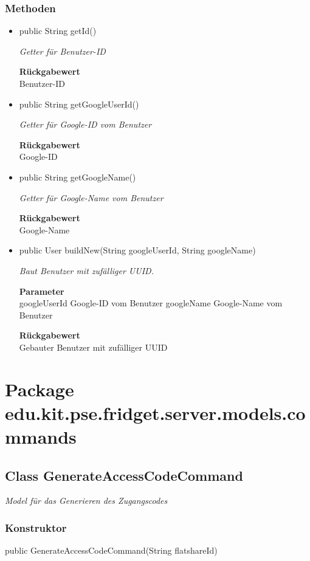 \documentclass[a4paper]{scrreprt}
\begin{document}
        \subsubsection{Methoden}
        \begin{itemize}
        	\item{public String getId()}
        	
        	\textit{Getter für Benutzer-ID}
        	
        	
        	
        	\textbf{Rückgabewert} \\
        	Benutzer-ID        \item{public String getGoogleUserId()}
        	
        	\textit{Getter für Google-ID vom Benutzer}
        	
        	
        	
        	\textbf{Rückgabewert} \\
        	Google-ID        \item{public String getGoogleName()}
        	
        	\textit{Getter für Google-Name vom Benutzer}
        	
        	
        	
        	\textbf{Rückgabewert} \\
        	Google-Name        \item{public User buildNew(String googleUserId, String googleName)}
        	
        	\textit{Baut Benutzer mit zufälliger UUID.}
        	
        	\textbf{Parameter} \\
        	googleUserId Google-ID vom Benutzer
        	googleName Google-Name vom Benutzer
        	
        	\textbf{Rückgabewert} \\
        	Gebauter Benutzer mit zufälliger UUID
        \end{itemize}
        \section{Package edu.kit.pse.fridget.server.models.commands}
        \subsection{Class GenerateAccessCodeCommand}
        \textit{Model für das Generieren des Zugangscodes}
        \subsubsection{Konstruktor}
        public GenerateAccessCodeCommand(String flatshareId)
\end{document}
